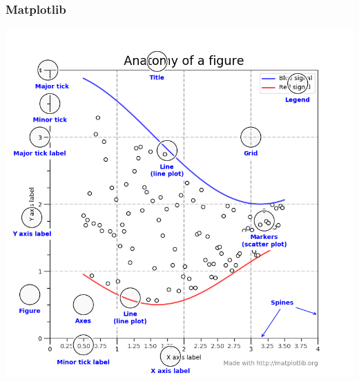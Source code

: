 \documentclass[aspectratio=169]{beamer}
\begin{document}
\begin{frame}
    \frametitle{Matplotlib}
    \centering
    \includegraphics[scale=0.25]{images/matplotlib-anatomy.png}
\end{frame}
\end{document}
